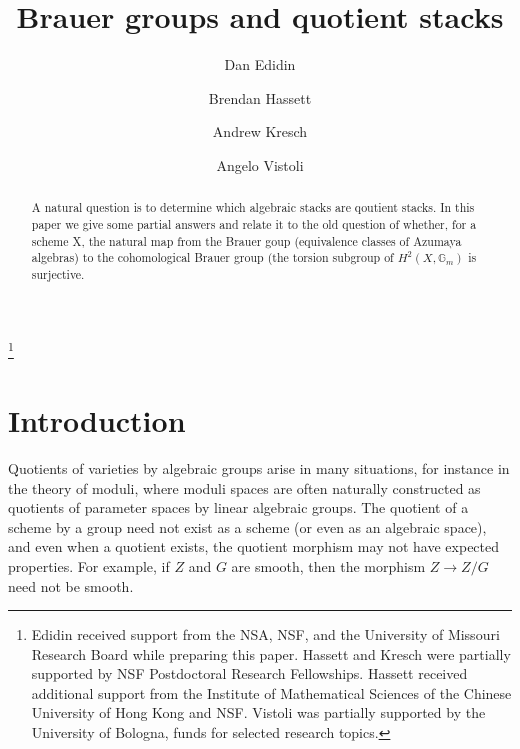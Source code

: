 \documentclass[12pt]{amsart}
\theoremstyle{plain}
\theoremstyle{definition}
\theoremstyle{remark}
\begin{document}
\title{
  Brauer groups and quotient stacks
}
\author[D. Edidin]{Dan Edidin}
\address{
  Department of Mathematics,
  University of Missouri,
  Columbia, MO 65211
}
\author[B. Hassett]{Brendan Hassett}
\address{
  Department of Mathematics--MS 136,
  Rice University,
  6100 S. Main St.,
  Houston, TX 77005-1892
}
\author[A. Kresch]{Andrew Kresch}
\address{
  Department of Mathematics,
  University of Pennsylvania,
  Philadelphia, PA 19104
}
\author[A. Vistoli]{Angelo Vistoli}
\address{
  Dipartimento di Matematica,
  Universit\`a di Bologna,
  40126 Bologna, Italy
}

\thanks{Edidin received support from the NSA, NSF, and the
University of Missouri Research Board while preparing this paper.
Hassett and Kresch were  partially supported by NSF Postdoctoral 
Research Fellowships. Hassett  received additional support from 
the Institute of  Mathematical Sciences of the Chinese University 
of Hong Kong and NSF. Vistoli was partially supported by
the University of Bologna, funds for selected research topics.}


\maketitle
\begin{abstract}
A natural question is to determine which algebraic stacks are
qoutient stacks. In this paper we give some partial answers and
relate it to the old question of whether, for a scheme X, the
natural map from the Brauer goup (equivalence classes of Azumaya
algebras) to the cohomological Brauer group (the torsion
subgroup of $H^2(X,{\mathbb G}_m)$ is surjective.
\end{abstract}


\section{Introduction} \label{s.intro}

Quotients of varieties by algebraic groups arise in many situations,
for instance in the theory of moduli,
where moduli
spaces are often naturally constructed as quotients of parameter spaces by
linear algebraic groups.
The quotient of a scheme by a group need not exist as
a scheme (or even as an algebraic space), and even when a quotient
exists,
the quotient morphism may not have expected
properties. For example, if $Z$ and $G$ are smooth, then the morphism
$Z \rightarrow Z/G$ need not be smooth.
\end{document}
